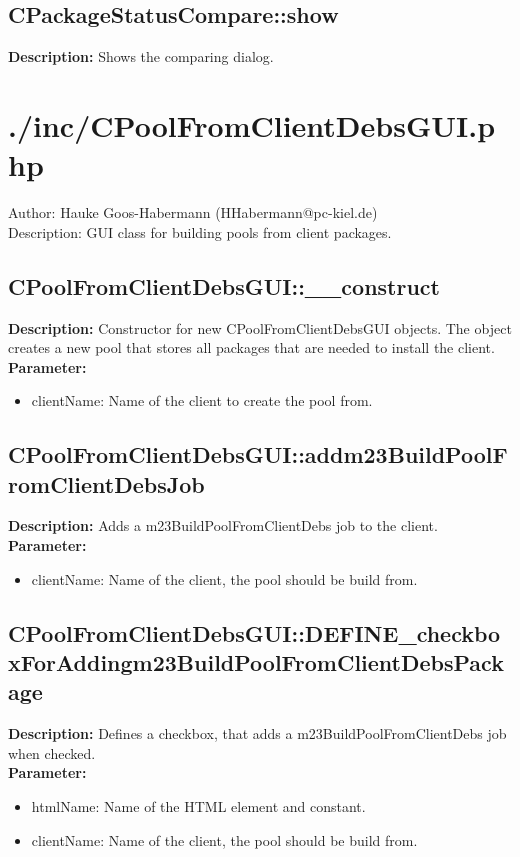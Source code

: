\subsection{CPackageStatusCompare::show}
\textbf{Description:} Shows the comparing dialog.\\

\newpage\section{./inc/CPoolFromClientDebsGUI.php}
 Author: Hauke Goos-Habermann (HHabermann@pc-kiel.de)\\
 Description: GUI class for building pools from client packages.\\

\subsection{CPoolFromClientDebsGUI::\_\_construct}
\textbf{Description:} Constructor for new CPoolFromClientDebsGUI objects. The object creates a new pool that stores all packages that are needed to install the client.\\
\textbf{Parameter:}
\begin{itemize}
\item clientName: Name of the client to create the pool from.
\end{itemize}

\subsection{CPoolFromClientDebsGUI::addm23BuildPoolFromClientDebsJob}
\textbf{Description:} Adds a m23BuildPoolFromClientDebs job to the client.\\
\textbf{Parameter:}
\begin{itemize}
\item clientName: Name of the client, the pool should be build from.
\end{itemize}

\subsection{CPoolFromClientDebsGUI::DEFINE\_checkboxForAddingm23BuildPoolFromClientDebsPackage}
\textbf{Description:} Defines a checkbox, that adds a m23BuildPoolFromClientDebs job when checked.\\
\textbf{Parameter:}
\begin{itemize}
\item htmlName: Name of the HTML element and constant.
\item clientName: Name of the client, the pool should be build from.
\end{itemize}


